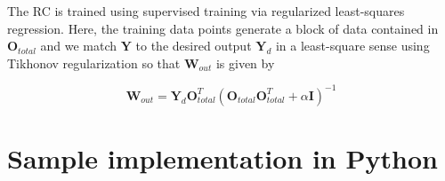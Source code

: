 \documentclass[11pt, oneside]{article}
\begin{document}
The RC is trained using supervised training via regularized least-squares regression. Here, the training data points generate a block of data contained in \(\mathbf{O}_{total}\) and we match \(\mathbf{Y}\) to the desired output \(\mathbf{Y}_d\) in a least-square sense using Tikhonov regularization so that \(\mathbf{W}_{out}\) is given by

\begin{equation}
    \mathbf{W}_{out} = \mathbf{Y}_d \mathbf{O}_{total}^T (\mathbf{O}_{total} \mathbf{O}_{total}^T + \alpha \mathbf{I})^{-1}
\end{equation}

\clearpage
\section{Sample implementation in Python}
\printbibliography
\end{document}
